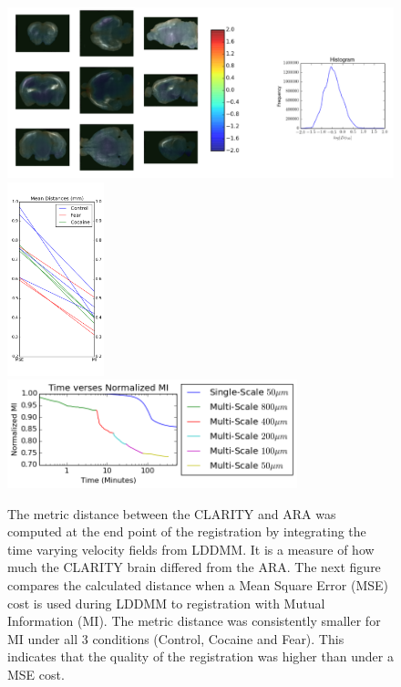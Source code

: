 \documentclass[simplex.tex]{subfiles}
\begin{document}
\begin{figure}[h!]
\begin{cframed}
\centering
\includegraphics[width=.73\textwidth]{../../figs/ndreg.png}
\includegraphics[width=0.25\textwidth]{../../figs/ndreg-md.png}\\
\includegraphics[width=0.75\textwidth]{../../figs/ndreg-time.png}
\caption{
  The metric distance between the CLARITY and ARA was computed at the
  end point of the registration by integrating the time varying velocity
  fields from LDDMM.  It is a measure of how much the CLARITY brain
  differed from the ARA. The next figure compares the calculated
  distance when a Mean Square Error (MSE) cost is used during LDDMM to
  registration with Mutual Information (MI).  The metric distance was
  consistently smaller for MI under all 3 conditions (Control, Cocaine
  and Fear).  This indicates that the quality of the registration was
  higher than under a MSE cost.
}
\label{fig:ndreg}
\end{cframed}
\end{figure}
\end{document}
